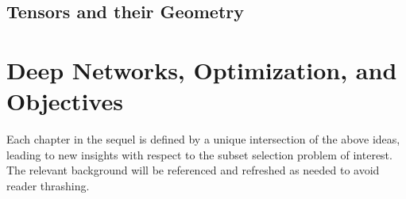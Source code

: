 \subsection{Tensors and their Geometry}


\section{Deep Networks, Optimization, and Objectives}


Each chapter in the sequel
is defined by a unique intersection
of the above ideas, leading to new insights
with respect to the subset selection problem of interest.
The relevant background will be referenced and refreshed 
as needed to avoid reader thrashing.